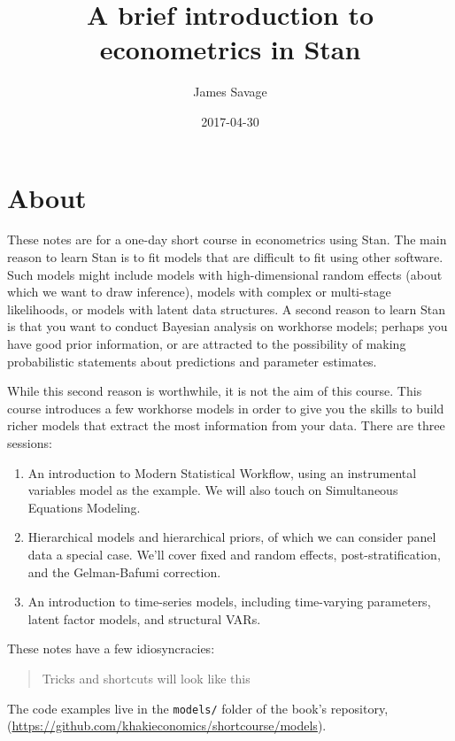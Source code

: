 \documentclass[]{book}
\title{A brief introduction to econometrics in Stan}
\author{James Savage}
\date{2017-04-30}
\providecommand{\tightlist}{%
  \setlength{\itemsep}{0pt}\setlength{\parskip}{0pt}}
\begin{document}
\maketitle

{
\setcounter{tocdepth}{1}
\tableofcontents
}
\chapter*{About}\label{about}

These notes are for a one-day short course in econometrics using Stan.
The main reason to learn Stan is to fit models that are difficult to fit
using other software. Such models might include models with
high-dimensional random effects (about which we want to draw inference),
models with complex or multi-stage likelihoods, or models with latent
data structures. A second reason to learn Stan is that you want to
conduct Bayesian analysis on workhorse models; perhaps you have good
prior information, or are attracted to the possibility of making
probabilistic statements about predictions and parameter estimates.

While this second reason is worthwhile, it is not the aim of this
course. This course introduces a few workhorse models in order to give
you the skills to build richer models that extract the most information
from your data. There are three sessions:

\begin{enumerate}
\def\labelenumi{\arabic{enumi}.}
\tightlist
\item
  An introduction to Modern Statistical Workflow, using an instrumental
  variables model as the example. We will also touch on Simultaneous
  Equations Modeling.
\item
  Hierarchical models and hierarchical priors, of which we can consider
  panel data a special case. We'll cover fixed and random effects,
  post-stratification, and the Gelman-Bafumi correction.
\item
  An introduction to time-series models, including time-varying
  parameters, latent factor models, and structural VARs.
\end{enumerate}

These notes have a few idiosyncracies:

\begin{quote}
Tricks and shortcuts will look like this
\end{quote}

The code examples live in the \texttt{models/} folder of the book's
repository,
(\url{https://github.com/khakieconomics/shortcourse/models}).
\end{document}
